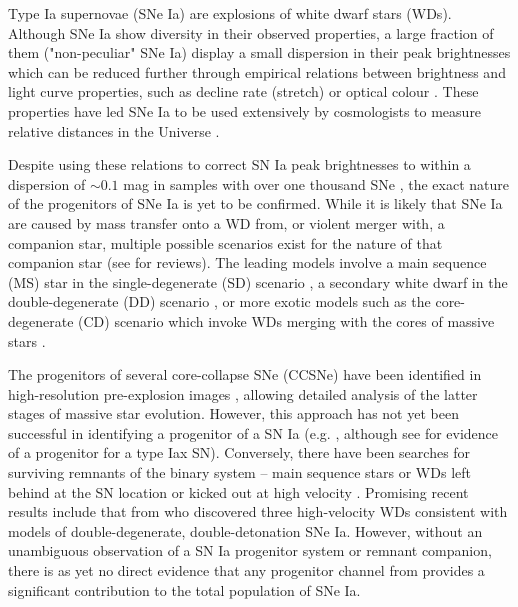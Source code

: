 \documentclass[fleqn,usenatbib]{mnras}
\begin{document}
Type Ia supernovae (SNe Ia) are explosions of white dwarf stars (WDs). Although SNe Ia show diversity in their observed properties, a large fraction of them ("non-peculiar" SNe Ia) display a small dispersion in their peak brightnesses which can be reduced further through empirical relations between brightness and light curve properties, such as decline rate (stretch) or optical colour \citep{Rust1974,Pskovskii1977,Phillips1993,Tripp1998}. These properties have led SNe Ia to be used extensively by cosmologists to measure relative distances in the Universe \citep{Riess1998,Perlmutter1999}.

Despite using these relations to correct SN Ia peak brightnesses to within a dispersion of $\sim 0.1$ mag in samples with over one thousand SNe \citep{Scolnic2018}, the exact nature of the progenitors of SNe Ia is yet to be confirmed. While it is likely that SNe Ia are caused by mass transfer onto a WD from, or violent merger with, a companion star, multiple possible scenarios exist for the nature of that companion star (see \citealt{Maoz2014,Ruiter2020} for reviews). The leading models involve a main sequence (MS) star in the single-degenerate (SD) scenario \citep{Whelan1973,Nomoto1982}, a secondary white dwarf in the double-degenerate (DD) scenario \citep{Tutukov1976,Iben1984,Webbink1984}, or more exotic models such as the core-degenerate (CD) scenario which invoke WDs merging with the cores of massive stars \citep{Kashi2011,Ilkov2012}. 

The progenitors of several core-collapse SNe (CCSNe) have been identified in high-resolution pre-explosion images \citep{Smartt2009,Eldridge2013}, allowing detailed analysis of the latter stages of massive star evolution. However, this approach has not yet been successful in identifying a progenitor of a SN Ia (e.g. \citealt{Graur2014a,Kelly2014,Graur2019}, although see \citet{McCully2014} for evidence of a progenitor for a type Iax SN). Conversely, there have been searches for surviving remnants of the binary system -- main sequence stars or WDs left behind at the SN location or kicked out at high velocity \citep[e.g.][]{Schaefer2012,Ruiz-Lapuente2018,Kerzendorf2018,Kerzendorf2019}. Promising recent results include that from \citet{Shen2018} who discovered three high-velocity WDs consistent with models of double-degenerate, double-detonation SNe Ia. However, without an unambiguous observation of a SN Ia progenitor system or remnant companion, there is as yet no direct evidence that any progenitor channel from provides a significant contribution to the total population of SNe Ia.
\end{document}
